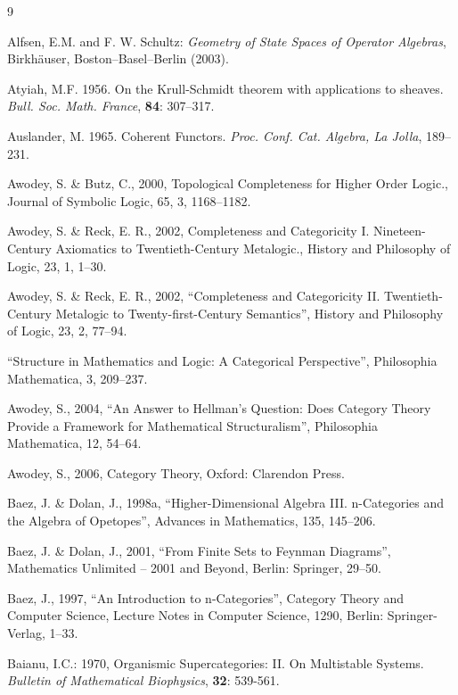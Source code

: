 \documentclass[12pt]{article}
\begin{document}
\begin{thebibliography} {9}

Alfsen, E.M. and F. W. Schultz: \emph{Geometry of State Spaces of Operator Algebras}, Birkh\"auser, Boston--Basel--Berlin (2003).

Atyiah, M.F. 1956. On the Krull-Schmidt theorem with applications to sheaves.
\emph{Bull. Soc. Math. France}, \textbf{84}: 307--317.

Auslander, M. 1965. Coherent Functors. \emph{Proc. Conf. Cat. Algebra, La Jolla},
189--231.
  
Awodey, S. \& Butz, C., 2000, Topological Completeness for Higher Order Logic., Journal of Symbolic Logic, 65, 3, 1168--1182. 

Awodey, S. \& Reck, E. R., 2002, Completeness and Categoricity I. 
Nineteen-Century Axiomatics to Twentieth-Century Metalogic., History and Philosophy of Logic, 23, 1, 1--30.
  
Awodey, S. \& Reck, E. R., 2002, ``Completeness and Categoricity II. Twentieth-Century Metalogic to Twenty-first-Century Semantics'', History and Philosophy of Logic, 23, 2, 77--94.  

``Structure in Mathematics and Logic: A Categorical Perspective'', Philosophia Mathematica, 3, 209--237. 

Awodey, S., 2004, ``An Answer to Hellman's Question: Does Category Theory Provide a Framework for Mathematical Structuralism'', Philosophia Mathematica, 12, 54--64. 

Awodey, S., 2006, Category Theory, Oxford: Clarendon Press. 

Baez, J. \& Dolan, J., 1998a, ``Higher-Dimensional Algebra III. n-Categories and the Algebra of Opetopes'', Advances in Mathematics, 135, 145--206.  


Baez, J. \& Dolan, J., 2001, ``From Finite Sets to Feynman Diagrams'', Mathematics Unlimited -- 2001 and Beyond, Berlin: Springer, 29--50.  

Baez, J., 1997, ``An Introduction to n-Categories'', Category Theory and Computer Science, Lecture Notes in Computer Science, 1290, Berlin: Springer-Verlag, 1--33. 

Baianu, I.C.: 1970, Organismic Supercategories: II. On Multistable Systems. \emph{Bulletin of Mathematical Biophysics}, \textbf{32}: 539-561.
 

\end{thebibliography}
\end{document}
